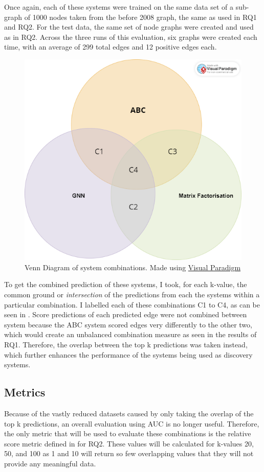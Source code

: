 \documentclass{l4proj}
\begin{document}
Once again, each of these systems were trained on the same data set of a sub-graph of 1000 nodes taken from the before 2008 graph, the same as used in RQ1 and RQ2. For the test data, the same set of node graphs were created and used as in RQ2. Across the three runs of this evaluation, six graphs were created each time, with an average of 299 total edges and 12 positive edges each. \\

\begin{figure}[h]
    \centering
    \includegraphics[width=0.6\linewidth]{images/Combination_venn.png}
    \caption{Venn Diagram of system combinations. Made using \href{https://www.visual-paradigm.com}{Visual Paradigm}}
    \label{fig:venn}
\end{figure}

To get the combined prediction of these systems, I took, for each k-value, the common ground or \textit{intersection} of the predictions from each the systems within a particular combination. I labelled each of these combinations C1 to C4, as can be seen in . Score predictions of each predicted edge were not combined between system because the ABC system scored edges very differently to the other two, which would create an unbalanced combination measure as seen in the results of RQ1. Therefore, the overlap between the top k predictions was taken instead, which further enhances the performance of the systems being used as discovery systems. \\

\subsection{Metrics}

Because of the vastly reduced datasets caused by only taking the overlap of the top k predictions, an overall evaluation using AUC is no longer useful. Therefore, the only metric that will be used to evaluate these combinations is the relative score metric defined in for RQ2. These values will be calculated for k-values 20, 50, and 100 as 1 and 10 will return so few overlapping values that they will not provide any meaningful data.\\
\end{document}
